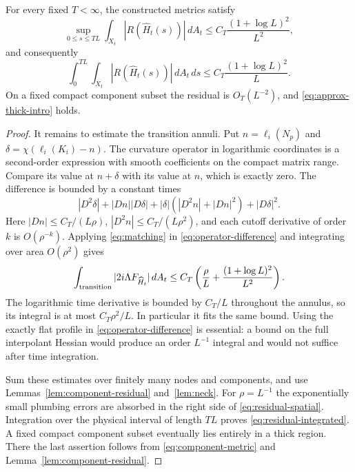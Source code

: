 \begin{proposition}\label{prop:residual}
For every fixed $T<\infty$, the constructed metrics satisfy
\begin{equation}\label{eq:residual-spatial}
 \sup_{0\le s\le TL}\int_{X_t}|R(\widehat H_t(s))|\,dA_t
 \le C_T\frac{(1+\log L)^2}{L^2},
\end{equation}
and consequently
\begin{equation}\label{eq:residual-integrated}
 \int_0^{TL}\!\int_{X_t}|R(\widehat H_t(s))|\,dA_t\,ds
 \le C_T\frac{(1+\log L)^2}{L}.
\end{equation}
On a fixed compact component subset the residual is $O_T(L^{-2})$,
and \eqref{eq:approx-thick-intro} holds.
\end{proposition}
\begin{proof}
It remains to estimate the transition annuli. Put
$n=\ell_i(N_p)$ and $\delta=\chi(\ell_i(K_i)-n)$.
The curvature operator in logarithmic coordinates is a second-order
expression with smooth coefficients on the compact matrix range.
Compare its value at $n+\delta$ with its value at $n$, which is
exactly zero. The difference is bounded by a constant times
\begin{equation}\label{eq:operator-difference}
 |D^2\delta|+|Dn||D\delta|
 +|\delta|(|D^2n|+|Dn|^2)+|D\delta|^2.
\end{equation}
Here $|Dn|\le C_T/(L\rho)$,
$|D^2n|\le C_T/(L\rho^2)$, and each cutoff derivative of order
$k$ is $O(\rho^{-k})$. Applying \eqref{eq:matching} in
\eqref{eq:operator-difference} and integrating over area
$O(\rho^2)$ gives
\[
 \int_{\rm transition}|2i\Lambda F_{\widehat H_t}|\,dA_t
 \le C_T\left(\frac\rho L+\frac{(1+\log L)^2}{L^2}\right).
\]
The logarithmic time derivative is bounded by $C_T/L$ throughout
the annulus, so its integral is at most $C_T\rho^2/L$.
In particular it fits the same bound. Using the exactly flat
profile in \eqref{eq:operator-difference} is essential: a bound on
the full interpolant Hessian would produce an order $L^{-1}$
integral and would not suffice after time integration.

Sum these estimates over finitely many nodes and components, and
use Lemmas~\ref{lem:component-residual} and~\ref{lem:neck}.
For $\rho=L^{-1}$ the exponentially small plumbing errors are
absorbed in the right side of \eqref{eq:residual-spatial}.
Integration over the physical interval of length $TL$ proves
\eqref{eq:residual-integrated}. A fixed compact component subset
eventually lies entirely in a thick region. There the last assertion
follows from \eqref{eq:component-metric} and
Lemma~\ref{lem:component-residual}.
\end{proof}
